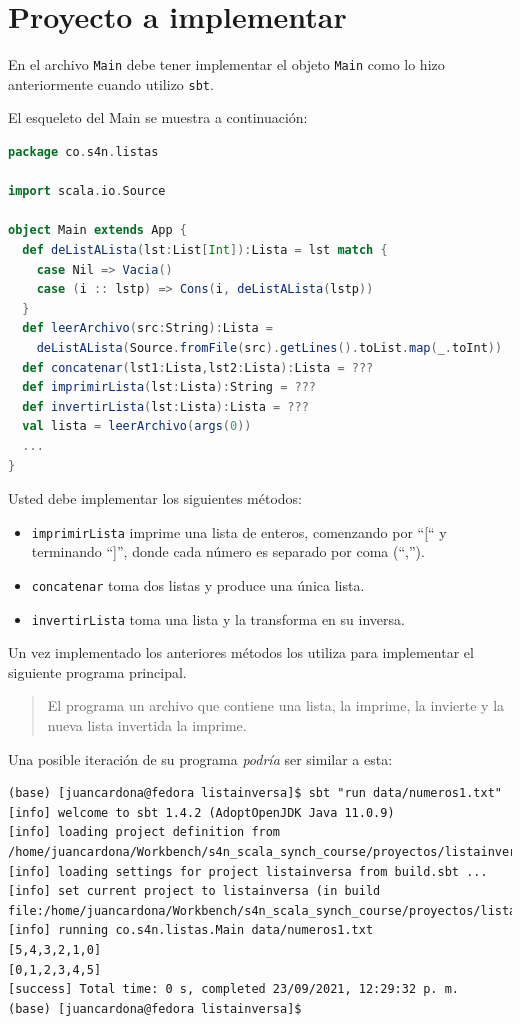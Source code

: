 \documentclass[12pt]{article}
\newcounter{problema}
\begin{document}
\section{Proyecto a implementar}
\label{sec:problema-resolver}

En el archivo \texttt{Main} debe tener implementar el objeto \texttt{Main} como lo hizo anteriormente cuando utilizo \texttt{sbt}.

El esqueleto del Main se muestra a continuación:

\begin{lstlisting}[language=Scala]
package co.s4n.listas

import scala.io.Source

object Main extends App {
  def deListALista(lst:List[Int]):Lista = lst match {
    case Nil => Vacia()
    case (i :: lstp) => Cons(i, deListALista(lstp))
  }
  def leerArchivo(src:String):Lista =
    deListALista(Source.fromFile(src).getLines().toList.map(_.toInt))
  def concatenar(lst1:Lista,lst2:Lista):Lista = ???
  def imprimirLista(lst:Lista):String = ???
  def invertirLista(lst:Lista):Lista = ???
  val lista = leerArchivo(args(0))
  ...
}
\end{lstlisting}

Usted debe implementar los siguientes métodos:
\begin{itemize}
\item \texttt{imprimirLista} imprime una lista de enteros, comenzando por ``[`` y terminando ``]'', donde cada número es separado por coma (``,'').
\item \texttt{concatenar} toma dos listas y produce una única lista.
\item \texttt{invertirLista} toma una lista y la transforma en su inversa.
\end{itemize}

Un vez implementado los anteriores métodos los utiliza para implementar el siguiente programa principal.

\begin{quote}
  El programa un archivo que contiene una lista, la imprime, la invierte y la nueva lista invertida la imprime.
\end{quote}

Una posible iteración de su programa \emph{podría} ser similar a esta:

{\footnotesize
\begin{verbatim}
(base) [juancardona@fedora listainversa]$ sbt "run data/numeros1.txt"
[info] welcome to sbt 1.4.2 (AdoptOpenJDK Java 11.0.9)
[info] loading project definition from /home/juancardona/Workbench/s4n_scala_synch_course/proyectos/listainversa/project
[info] loading settings for project listainversa from build.sbt ...
[info] set current project to listainversa (in build file:/home/juancardona/Workbench/s4n_scala_synch_course/proyectos/listainversa/)
[info] running co.s4n.listas.Main data/numeros1.txt
[5,4,3,2,1,0]
[0,1,2,3,4,5]
[success] Total time: 0 s, completed 23/09/2021, 12:29:32 p. m.
(base) [juancardona@fedora listainversa]$  
\end{verbatim}
}

% 
% 
\end{document}

